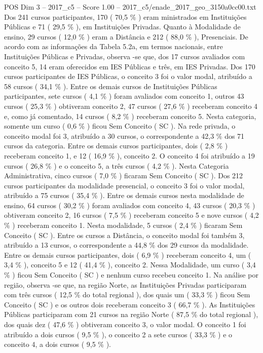 \begin{textsample}{POS Dim 3 – 2017\_c5 – Score 1.00 – 2017\_c5/enade\_2017\_geo\_3150a0cc00.txt}
Dos 241 cursos participantes, 170 ( 70,5 \% ) eram ministrados em Instituições Públicas e 71 ( 29,5 \% ), em Instituições Privadas.
Quanto à Modalidade de ensino, 29 cursos ( 12,0 \% ) eram a Distância e 212 ( 88,0 \% ), Presenciais.
De acordo com as informações da Tabela 5.2a, em termos nacionais, entre Instituições Públicas e Privadas, observa -se que, dos 17 cursos avaliados com conceito 5, 14 eram oferecidos em IES Públicas e três, em IES Privadas.
Dos 170 cursos participantes de IES Públicas, o conceito 3 foi o valor modal, atribuído a 58 cursos ( 34,1 \% ).
Entre os demais cursos de Instituições Públicas participantes, sete cursos ( 4,1 \% ) foram avaliados com conceito 1, outros 43 cursos ( 25,3 \% ) obtiveram conceito 2, 47 cursos ( 27,6 \% ) receberam conceito 4 e, como já comentado, 14 cursos ( 8,2 \% ) receberam conceito 5.
Nesta categoria, somente um curso ( 0,6 \% ) ficou Sem Conceito ( SC ).
Na rede privada, o conceito modal foi 3, atribuído a 30 cursos, o correspondente a 42,3 \% dos 71 cursos da categoria.
Entre os demais cursos participantes, dois ( 2,8 \% ) receberam conceito 1, e 12 ( 16,9 \% ), conceito 2.
O conceito 4 foi atribuído a 19 cursos ( 26,8 \% ) e o conceito 5, a três cursos ( 4,2 \% ).
Nesta Categoria Administrativa, cinco cursos ( 7,0 \% ) ficaram Sem Conceito ( SC ).
Dos 212 cursos participantes da modalidade presencial, o conceito 3 foi o valor modal, atribuído a 75 cursos ( 35,4 \% ).
Entre os demais cursos nesta modalidade de ensino, 64 cursos ( 30,2 \% ) foram avaliados com conceito 4, 43 cursos ( 20,3 \% ) obtiveram conceito 2, 16 cursos ( 7,5 \% ) receberam conceito 5 e nove cursos ( 4,2 \% ) receberam conceito 1.
Nesta modalidade, 5 cursos ( 2,4 \% ) ficaram Sem Conceito ( SC ).
Entre os cursos a Distância, o conceito modal foi também 3, atribuído a 13 cursos, o correspondente a 44,8 \% dos 29 cursos da modalidade.
Entre os demais cursos participantes, dois ( 6,9 \% ) receberam conceito 4, um ( 3,4 \% ), conceito 5 e 12 ( 41,4 \% ), conceito 2.
Nessa Modalidade, um curso ( 3,4 \% ) ficou Sem Conceito ( SC ) e nenhum curso recebeu conceito 1.
Na análise por região, observa -se que, na região Norte, as Instituições Privadas participaram com três cursos ( 12,5 \% do total regional ), dos quais um ( 33,3 \% ) ficou Sem Conceito ( SC ) e os outros dois receberam conceito 3 ( 66,7 \% ).
As Instituições Públicas participaram com 21 cursos na região Norte ( 87,5 \% do total regional ), dos quais dez ( 47,6 \% ) obtiveram conceito 3, o valor modal.
O conceito 1 foi atribuído a dois cursos ( 9,5 \% ), o conceito 2 a sete cursos ( 33,3 \% ) e o conceito 4, a dois cursos ( 9,5 \% ).

\end{textsample}
